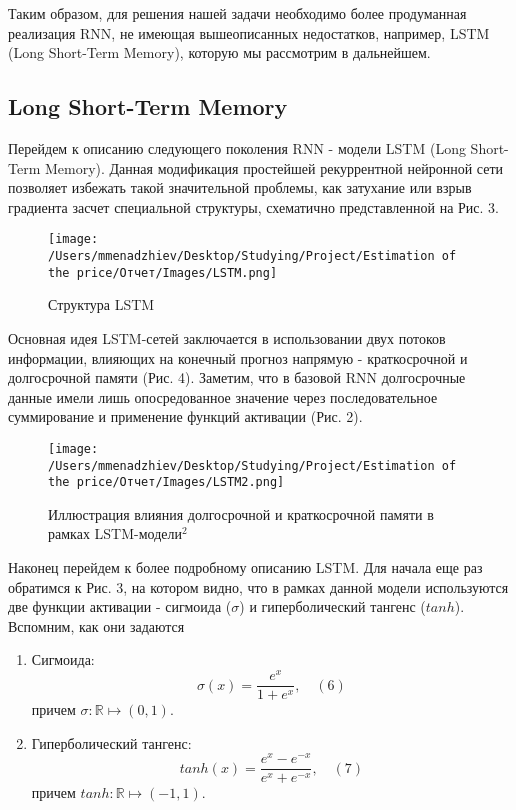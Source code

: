 Таким образом, для решения нашей задачи необходимо более продуманная реализация RNN, не имеющая вышеописанных недостатков, например, LSTM (Long Short-Term Memory), которую мы рассмотрим в дальнейшем.

\subsection{Long Short-Term Memory}

Перейдем к описанию следующего поколения RNN - модели LSTM (Long Short-Term Memory). Данная модификация простейшей рекуррентной нейронной сети позволяет избежать такой значительной проблемы, как затухание или взрыв градиента засчет специальной структуры, схематично представленной на Рис. 3.

\begin{figure}[H]
    \centering
    \texttt{[image: /Users/mmenadzhiev/Desktop/Studying/Project/Estimation of the price/Отчет/Images/LSTM.png]}
    \caption{Структура LSTM}
\end{figure}

Основная идея LSTM-сетей заключается в использовании двух потоков информации, влияющих на конечный прогноз напрямую - краткосрочной и долгосрочной памяти (Рис. 4). Заметим, что в базовой RNN  долгосрочные данные имели лишь опосредованное значение через последовательное суммирование и применение функций активации (Рис. 2).

\begin{figure}[H]
    \centering
    \texttt{[image: /Users/mmenadzhiev/Desktop/Studying/Project/Estimation of the price/Отчет/Images/LSTM2.png]}
    \caption{Иллюстрация влияния долгосрочной и краткосрочной памяти в рамках LSTM-модели$\text{}^2$}
\end{figure}

Наконец перейдем к более подробному описанию LSTM. Для начала еще раз обратимся к Рис. 3, на котором видно, что в рамках данной модели используются две функции активации - сигмоида ($\sigma$) и гиперболический тангенс ($tanh$). Вспомним, как они задаются
\begin{enumerate}
\item Сигмоида:
\[
\sigma(x) = \frac{e^x}{1 + e^x}, \quad (6)
\]
причем $\sigma: \mathbb R \mapsto (0, 1)$.

\item Гиперболический тангенс:
\[
tanh(x) = \frac{e^x - e^{-x}}{e^x + e^{-x}}, \quad (7)
\]
причем $tanh: \mathbb R \mapsto (-1, 1)$.
\end{enumerate}

